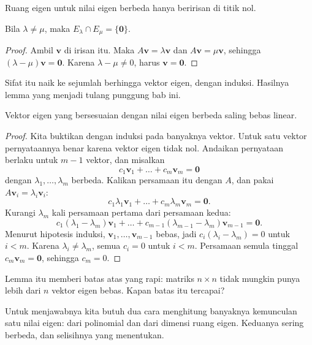Ruang eigen untuk nilai eigen berbeda hanya beririsan di titik nol.

\begin{proposisi}
Bila $\lambda\neq\mu$, maka $E_{\lambda}\cap E_{\mu}=\{\mathbf{0}\}$.
\end{proposisi}

\begin{proof}
Ambil $\mathbf{v}$ di irisan itu. Maka $A\mathbf{v}=\lambda\mathbf{v}$ dan
$A\mathbf{v}=\mu\mathbf{v}$, sehingga $(\lambda-\mu)\mathbf{v}=\mathbf{0}$. Karena
$\lambda-\mu\neq0$, harus $\mathbf{v}=\mathbf{0}$.
\end{proof}

Sifat itu naik ke sejumlah berhingga vektor eigen, dengan induksi. Hasilnya lemma yang menjadi
tulang punggung bab ini.

\begin{lemma}
Vektor eigen yang bersesuaian dengan nilai eigen berbeda saling bebas linear.
\end{lemma}

\begin{proof}
Kita buktikan dengan induksi pada banyaknya vektor. Untuk satu vektor pernyataannya benar karena
vektor eigen tidak nol. Andaikan pernyataan berlaku untuk $m-1$ vektor, dan misalkan
\[
  c_{1}\mathbf{v}_{1}+\dots+c_{m}\mathbf{v}_{m}=\mathbf{0}
\]
dengan $\lambda_{1},\dots,\lambda_{m}$ berbeda. Kalikan persamaan itu dengan $A$, dan pakai
$A\mathbf{v}_{i}=\lambda_{i}\mathbf{v}_{i}$:
\[
  c_{1}\lambda_{1}\mathbf{v}_{1}+\dots+c_{m}\lambda_{m}\mathbf{v}_{m}=\mathbf{0}.
\]
Kurangi $\lambda_{m}$ kali persamaan pertama dari persamaan kedua:
\[
  c_{1}(\lambda_{1}-\lambda_{m})\mathbf{v}_{1}+\dots
  +c_{m-1}(\lambda_{m-1}-\lambda_{m})\mathbf{v}_{m-1}=\mathbf{0}.
\]
Menurut hipotesis induksi, $\mathbf{v}_{1},\dots,\mathbf{v}_{m-1}$ bebas, jadi
$c_{i}(\lambda_{i}-\lambda_{m})=0$ untuk $i<m$. Karena $\lambda_{i}\neq\lambda_{m}$, semua
$c_{i}=0$ untuk $i<m$. Persamaan semula tinggal $c_{m}\mathbf{v}_{m}=\mathbf{0}$, sehingga
$c_{m}=0$.
\end{proof}

Lemma itu memberi batas atas yang rapi: matriks $n\times n$ tidak mungkin punya lebih dari $n$
vektor eigen bebas. Kapan batas itu tercapai?

Untuk menjawabnya kita butuh dua cara menghitung banyaknya kemunculan satu nilai eigen: dari
polinomial dan dari dimensi ruang eigen. Keduanya sering berbeda, dan selisihnya yang menentukan.


